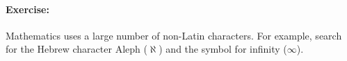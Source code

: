 \begin{verbatim}
        \end{verbatim}

        \paragraph{Exercise:} Mathematics uses a large number of non-Latin characters. For example, search for the Hebrew character Aleph ($\aleph$) and the symbol for infinity ($\infty$).

